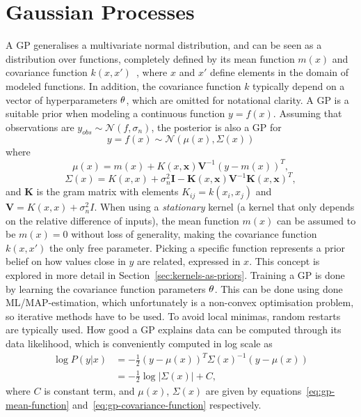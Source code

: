 \section{Gaussian Processes}\label{sec:gp}
A GP generalises a multivariate normal distribution, and can be seen
as a distribution over functions, completely defined by its
mean function $m(x)$ and covariance function $k(x, x')$~\cite{Rasmussen-Williams-2006}, 
where $x$ and $x'$ define elements
in the domain of modeled functions. In addition, the covariance function $k$ typically
depend on a vector of hyperparameters $\theta$, which are
omitted for notational clarity. A GP is a suitable prior when modeling
a continuous function $y = f(x)$. Assuming that observations are $y_{obs} \sim \mathcal{N}(f,\sigma_n)$, 
the posterior is also a GP for
\begin{equation}
  \label{eq:gp}
  y = f(x) \sim \mathcal{N}(\mu(x), \Sigma(x))
\end{equation}
where
\begin{equation}
  \label{eq:gp-mean-function}
  \mu(x) = m(x) + K(x, \textbf{x})\textbf{V}^{-1}{(y-m(x))}^{T},
\end{equation}
\begin{equation}
  \label{eq:gp-covariance-function}
  \Sigma(x) = K(x, x) + \sigma^{2}_n\textbf{I} - \textbf{K}(x, \textbf{x})\textbf{V}^{-1}{\textbf{K}(x, \textbf{x})}^{T},
\end{equation}
and $\textbf{K}$ is the gram matrix with elements $K_{ij} = k(x_i, x_j)$ 
and $\textbf{V} = K(x, x) + \sigma_n^2I$.
When using a \textit{stationary} kernel (a kernel that only depends on the
relative difference of inputs), the mean function $m(x)$ can be assumed to be $m(x) = 0$
without loss of generality, making the covariance function $k(x, x')$
the only free parameter. Picking a specific function represents a prior
belief on how values close in $y$ are related, expressed in $x$. This
concept is explored in more detail in Section~\ref{sec:kernels-as-priors}.
Training a GP is done by learning the covariance function parameters $\theta$.
This can be done using done ML/MAP-estimation, which unfortunately is a non-convex
optimisation problem, so iterative methods have to be used. To avoid
local minimas, random restarts are typically used. How good a GP explains data
can be computed through its data likelihood, which is conveniently
computed in log scale as 
\begin{equation}
  \label{eq:gp-log-likelihood}
  \begin{split}
    \log P(y|x) & = -\frac{1}{2}{(y - \mu(x))}^{T}{\Sigma(x)}^{-1}(y - \mu(x)) \\
    & = -\frac{1}{2}\log{|\Sigma(x)|}+C,
  \end{split}
\end{equation}
where $C$ is constant term, and $\mu(x)$, $\Sigma(x)$ are given by
equations~\ref{eq:gp-mean-function} and~\ref{eq:gp-covariance-function} 
respectively.

